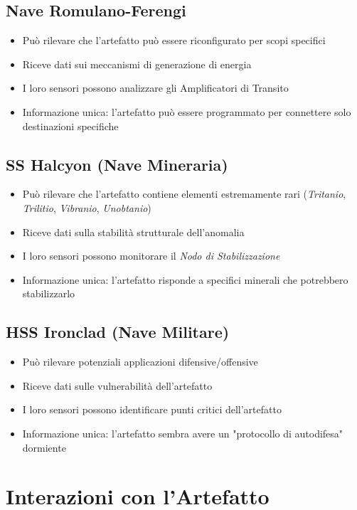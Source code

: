 \documentclass[letterpaper,twocolumn,openany,nodeprecatedcode]{dndbook}
\begin{document}
\subsection{Nave Romulano-Ferengi}
\begin{itemize}
    \item Può rilevare che l'artefatto può essere riconfigurato per scopi specifici
    \item Riceve dati sui meccanismi di generazione di energia
    \item I loro sensori possono analizzare gli Amplificatori di Transito
    \item Informazione unica: l'artefatto può essere programmato per connettere solo destinazioni specifiche
\end{itemize}

\subsection{SS Halcyon (Nave Mineraria)}
\begin{itemize}
    \item Può rilevare che l'artefatto contiene elementi estremamente rari (\textit{Tritanio}, \textit{Trilitio}, \textit{Vibranio}, \textit{Unobtanio})
    \item Riceve dati sulla stabilità strutturale dell'anomalia
    \item I loro sensori possono monitorare il \textit{Nodo di Stabilizzazione}
    \item Informazione unica: l'artefatto risponde a specifici minerali che potrebbero stabilizzarlo
\end{itemize}

\subsection{HSS Ironclad (Nave Militare)}
\begin{itemize}
    \item Può rilevare potenziali applicazioni difensive/offensive
    \item Riceve dati sulle vulnerabilità dell'artefatto
    \item I loro sensori possono identificare punti critici dell'artefatto
    \item Informazione unica: l'artefatto sembra avere un "protocollo di autodifesa" dormiente
\end{itemize}

\section{Interazioni con l'Artefatto}
\end{document}
